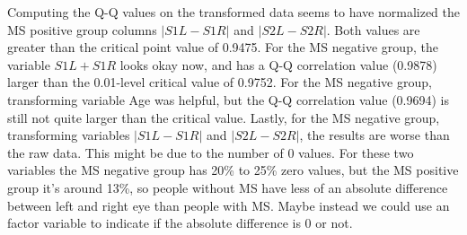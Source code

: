 Computing the Q-Q values on the transformed data seems to have normalized the MS positive group columns $\left|S1L - S1R\right|$ and $\left|S2L - S2R\right|$. 
Both values are greater than the critical point value of 0.9475. For the MS negative group, the variable $S1L + S1R$ looks okay now, and has a Q-Q correlation value (0.9878) larger than the 0.01-level critical value of 0.9752. 
For the MS negative group, transforming variable Age was helpful, but the Q-Q correlation value (0.9694) is still not quite larger than the critical value. 
Lastly, for the MS negative group, transforming variables $\left|S1L - S1R\right|$ and $\left|S2L - S2R\right|$, the results are worse than the raw data. 
This might be due to the number of 0 values. For these two variables the MS negative group has 20\% to 25\% zero values, but the MS positive group it's around 13\%, so people without MS have less of an absolute difference between left and right eye than people with MS. 
Maybe instead we could use an factor variable to indicate if the absolute difference is 0 or not.

